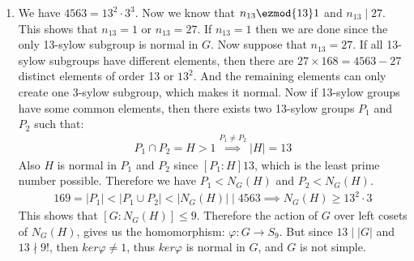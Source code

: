 \begin{enumerate}[label=]
    \item 
        We have $4563 = 13^2 \cdot 3^3$. Now we know that $n_{13} \ezmod{13} 1$ and $n_{13} \mid 27$. This shows that $n_{13} = 1$ or $n_{13} = 27$. If $n_{13} = 1$ then we are done since the only 13-sylow subgroup is normal in $G$. Now suppose that $n_{13} = 27$. If all 13-sylow subgroups have different elements, then there are $27 \times 168 = 4563 - 27$ distinct elements of order 13 or $13^2$. And the remaining elements can only create one 3-sylow subgroup, which makes it normal. Now if 13-sylow groups have some common elements, then there exists two 13-sylow groups $P_1$ and $P_2$ such that:
        \begin{gather*}
            P_1 \cap P_2 = H > 1 \overset{P_1 \ne P_2}{\implies} |H| = 13 
        \end{gather*}
        Also $H$ is normal in $P_1$ and $P_2$ since $[P_1:H] 13$, which is the least prime number possible. Therefore we have $P_1 < N_G(H)$ and $P_2 < N_G(H)$.
        \begin{gather*}
            169 = |P_1| < |P_1 \cup P_2| < |N_G(H)| \mid 4563 \implies N_G(H) \ge 13^2 \cdot 3
        \end{gather*}
        This shows that $[G: N_G(H)] \le 9$. Therefore the action of $G$ over left cosets of $N_G(H)$, gives us the homomorphism: $\varphi: G \to S_9$. But since $13 \mid |G|$ and $13 \nmid 9!$, then $ker \varphi \ne 1$, thus $ker \varphi$ is normal in $G$, and $G$ is not simple.
\end{enumerate}